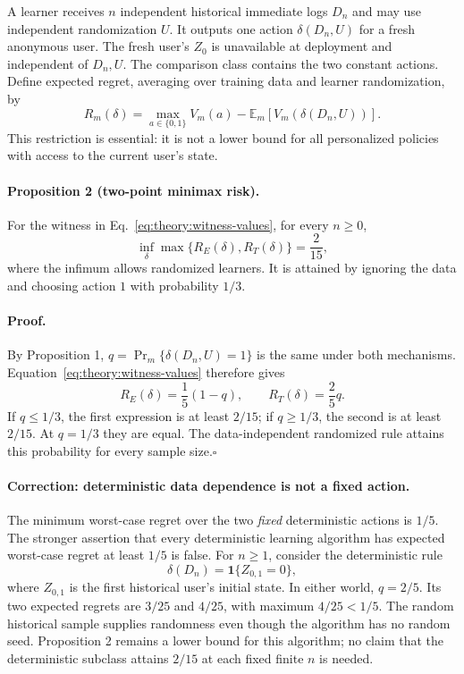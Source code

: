 A learner receives $n$ independent historical immediate logs $D_n$ and may
use independent randomization $U$. It outputs one action $\delta(D_n,U)$ for
a fresh anonymous user. The fresh user's $Z_0$ is unavailable at deployment
and independent of $D_n,U$. The comparison class contains the two constant
actions. Define expected regret, averaging over training data and learner
randomization, by
\begin{equation}
 R_m(\delta)=\max_{a\in\{0,1\}}V_m(a)
             -\mathbb E_m[V_m(\delta(D_n,U))].
\end{equation}
This restriction is essential: it is not a lower bound for all personalized
policies with access to the current user's state.

\paragraph{Proposition 2 (two-point minimax risk).}
For the witness in Eq.~\eqref{eq:theory:witness-values}, for every $n\geq0$,
\begin{equation}
 \inf_\delta\max\{R_E(\delta),R_T(\delta)\}=\frac{2}{15},
 \label{eq:theory:minimax}
\end{equation}
where the infimum allows randomized learners. It is attained by ignoring
the data and choosing action $1$ with probability $1/3$.

\paragraph{Proof.}
By Proposition 1, $q=\Pr_m\{\delta(D_n,U)=1\}$ is the same under both
mechanisms. Equation~\eqref{eq:theory:witness-values} therefore gives
\begin{equation}
 R_E(\delta)=\frac15(1-q),\qquad
 R_T(\delta)=\frac25q.
\end{equation}
If $q\leq1/3$, the first expression is at least $2/15$; if $q\geq1/3$,
the second is at least $2/15$. At $q=1/3$ they are equal. The data-independent
randomized rule attains this probability for every sample size.\hfill$\square$

\paragraph{Correction: deterministic data dependence is not a fixed action.}
The minimum worst-case regret over the two \emph{fixed} deterministic actions
is $1/5$. The stronger assertion that every deterministic learning algorithm
has expected worst-case regret at least $1/5$ is false. For $n\geq1$, consider
the deterministic rule
\begin{equation}
 \delta(D_n)=\mathbf 1\{Z_{0,1}=0\},
\end{equation}
where $Z_{0,1}$ is the first historical user's initial state. In either world,
$q=2/5$. Its two expected regrets are $3/25$ and $4/25$, with maximum
$4/25<1/5$. The random historical sample supplies randomness even though the
algorithm has no random seed. Proposition 2 remains a lower bound for this
algorithm; no claim that the deterministic subclass attains $2/15$ at each
fixed finite $n$ is needed.

